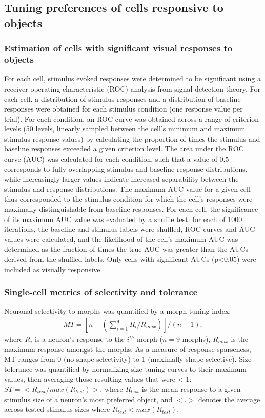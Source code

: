 \subsection{Tuning preferences of cells responsive to objects}

\subsubsection{Estimation of cells with significant visual responses to objects}
For each cell, stimulus evoked responses were determined to be significant using a receiver-operating-characteristic (ROC) analysis from signal detection theory\cite{}. For each cell, a distribution of stimulus responses and a distribution of baseline responses were obtained for each stimulus condition (one response value per trial). For each condition, an ROC curve was obtained across a range of criterion levels (50 levels, linearly sampled between the cell's minimum and maximum stimulus response values) by calculating the proportion of times the stimulus and baseline responses exceeded a given criterion level. The area under the ROC curve (AUC) was calculated for each condition, such that a value of 0.5 corresponds to fully overlapping stimulus and baseline response distributions, while increasingly larger values indicate increased separability between the stimulus and response distributions. The maximum AUC value for a given cell thus corresponded to the stimulus condition for which the cell's responses were maximally distinguishable from baseline responses. For each cell, the significance of its maximum AUC value was evaluated by a shuffle test:  for each of 1000 iterations, the baseline and stimulus labels were shuffled, ROC curves and AUC values were calculated, and the likelihood of the cell's maximum AUC was determined as the fraction of times the true AUC was greater than the AUCs derived from the shuffled labels. Only cells with significant AUCs (p<0.05) were included as visually responsive. 

\subsubsection{Single-cell metrics of selectivity and tolerance}
Neuronal selectivity to morphs was quantified by a morph tuning index\cite{Zoccolan2007}:
\begin{align}
MT=[n-(\sum_{i=1}^{9}R_i/R_{max})]/(n-1), 
\end{align}
where $R_i$ is a neuron’s response to the $i^{th}$ morph ($n=9$ morphs), $R_{max}$ is the maximum response amongst the morphs. As a measure of response sparseness, MT ranges from 0 (no shape selectivity) to 1 (maximally shape selective). Size tolerance was quantified by normalizing size tuning curves to their maximum values, then averaging those resulting values that were < 1:  $ST=<R_{test}/max(R_{test})>$, where $R_{test}$ is the mean response to a given stimulus size of a neuron’s most preferred object, and $<.>$ denotes the average across tested stimulus sizes where $R_{test}<max(R_{test})$\cite{Zoccolan2007}. 

